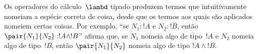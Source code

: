 \documentclass[../../../include/open-logic-section]{subfiles}
\begin{document}
Os operadores do cálculo~$\lambd$ tipado produzem termos que
intuitivamente nomeiam a espécie correta de coisa, desde que os termos
aos quais são aplicados nomeiem certas coisas. Por exemplo, ``se
$N_1 : !A$ e $N_2 : !B$, então $\pair{N_1}{N_2} : !A \land !B$'' afirma
que, se $N_1$ nomeia algo de tipo~$!A$ e $N_2$ nomeia algo de tipo~$!B$,
então $\pair{N_1}{N_2}$ nomeia algo de tipo $!A \land !B$.
\end{document}
